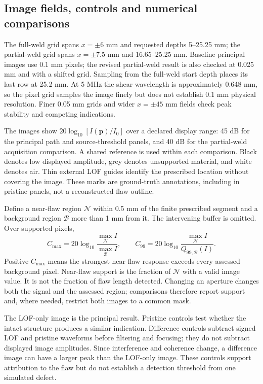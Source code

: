 \documentclass[11pt]{article}
\begin{document}
\subsection{Image fields, controls and numerical comparisons}
\label{saft:metrics}
The full-weld grid spans $x=\pm6$ mm and requested depths 5--25.25 mm; the partial-weld grid spans $x=\pm7.5$ mm and 16.65--25.25 mm. Baseline principal images use 0.1 mm pixels; the revised partial-weld result is also checked at 0.025 mm and with a shifted grid. Sampling from the full-weld start depth places its last row at 25.2 mm. At 5 MHz the shear wavelength is approximately 0.648 mm, so the pixel grid samples the image finely but does not establish 0.1 mm physical resolution. Finer 0.05 mm grids and wider $x=\pm45$ mm fields check peak stability and competing indications.

The images show $20\log_{10}[I(\mathbf p)/I_0]$ over a declared display range: 45 dB for the principal path and source-threshold panels, and 40 dB for the partial-weld acquisition comparison. A shared reference is used within each comparison. Black denotes low displayed amplitude, grey denotes unsupported material, and white denotes air. Thin external LOF guides identify the prescribed location without covering the image. These marks are ground-truth annotations, including in pristine panels, not a reconstructed flaw outline.

Define a near-flaw region $\mathcal N$ within 0.5 mm of the finite prescribed segment and a background region $\mathcal B$ more than 1 mm from it. The intervening buffer is omitted. Over supported pixels,
\begin{equation}
 C_{\max}=20\log_{10}\frac{\max_{\mathcal N}I}{\max_{\mathcal B}I},\qquad
 C_{99}=20\log_{10}\frac{\max_{\mathcal N}I}{Q_{99,\mathcal B}(I)}.
\end{equation}
Positive $C_{\max}$ means the strongest near-flaw response exceeds every assessed background pixel. Near-flaw support is the fraction of $\mathcal N$ with a valid image value. It is not the fraction of flaw length detected. Changing an aperture changes both the signal and the assessed region; comparisons therefore report support and, where needed, restrict both images to a common mask.

The LOF-only image is the principal result. Pristine controls test whether the intact structure produces a similar indication. Difference controls subtract signed LOF and pristine waveforms before filtering and focusing; they do not subtract displayed image amplitudes. Since interference and coherence change, a difference image can have a larger peak than the LOF-only image. These controls support attribution to the flaw but do not establish a detection threshold from one simulated defect.
\end{document}
